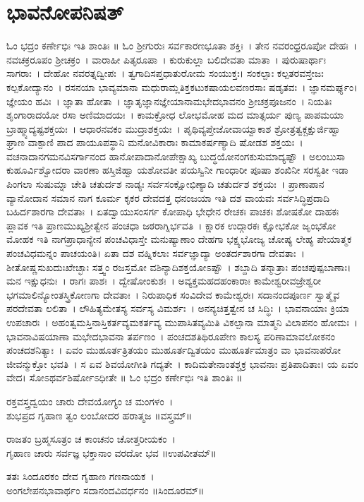 \section{ಭಾವನೋಪನಿಷತ್}
ಓಂ ಭದ್ರಂ ಕರ್ಣೇಭಿಃ ಇತಿ ಶಾಂತಿಃ ॥
ಓಂ ಶ್ರೀಗುರುಃ ಸರ್ವಕಾರಣಭೂತಾ ಶಕ್ತಿಃ~। ತೇನ ನವರಂಧ್ರರೂಪೋ ದೇಹಃ~। ನವಚಕ್ರರೂಪಂ ಶ್ರೀಚಕ್ರಂ~। ವಾರಾಹೀ ಪಿತೃರೂಪಾ~। ಕುರುಕುಲ್ಲಾ ಬಲಿದೇವತಾ ಮಾತಾ~। ಪುರುಷಾರ್ಥಾಃ ಸಾಗರಾಃ~। ದೇಹೋ ನವರತ್ನದ್ವೀಪಃ~। ತ್ವಗಾದಿಸಪ್ತಧಾತುರೋಮ ಸಂಯುಕ್ತಃ। ಸಂಕಲ್ಪಾಃ ಕಲ್ಪತರವಸ್ತೇಜಃ ಕಲ್ಪಕೋ\-ದ್ಯಾನಂ~। ರಸನಯಾ ಭಾವ್ಯಮಾನಾ ಮಧುರಾಮ್ಲತಿಕ್ತಕಟುಕಷಾಯಲವಣರಸಾಃ ಷಡೃತವಃ~। ಜ್ಞಾನಮರ್ಘ್ಯಂ। ಜ್ಞೇಯಂ ಹವಿಃ~। ಜ್ಞಾತಾ ಹೋತಾ~। ಜ್ಞಾತೃಜ್ಞಾನಜ್ಞೇಯಾನಾಮಭೇದಭಾವನಂ ಶ್ರೀಚಕ್ರಪೂಜನಂ~। ನಿಯತಿಃ ಶೃಂಗಾರಾದಯೋ ರಸಾ ಅಣಿಮಾದಯಃ~। ಕಾಮಕ್ರೋಧ ಲೋಭಮೋಹ ಮದ ಮಾತ್ಸರ್ಯ ಪುಣ್ಯ ಪಾಪಮಯಾ ಬ್ರಾಹ್ಮ್ಯಾದ್ಯಷ್ಟಶಕ್ತಯಃ~। ಆಧಾರನವಕಂ ಮುದ್ರಾಶಕ್ತಯಃ~। ಪೃಥಿವ್ಯಪ್ತೇಜೋವಾಯ್ವಾಕಾಶ ಶ್ರೋತ್ರತ್ವಕ್ಚಕ್ಷುರ್ಜಿಹ್ವಾ ಘ್ರಾಣ ವಾಕ್ಪಾಣಿ ಪಾದ ಪಾಯೂಪಸ್ಥಾನಿ ಮನೋವಿಕಾರಾಃ ಕಾಮಾಕರ್ಷಣ್ಯಾದಿ ಷೋಡಶ ಶಕ್ತಯಃ~। ವಚನಾದಾನಗಮನವಿಸರ್ಗಾನಂದ ಹಾನೋಪಾದಾನೋಪೇಕ್ಷಾಖ್ಯ ಬುದ್ಧಯೋನಂಗಕುಸುಮಾದ್ಯಷ್ಟೌ~। ಅಲಂಬುಸಾ ಕುಹೂರ್ವಿಶ್ವೋದರಾ ವಾರಣಾ ಹಸ್ತಿಜಿಹ್ವಾ ಯಶೋವತೀ ಪಯಸ್ವಿನೀ ಗಾಂಧಾರೀ ಪೂಷಾ ಶಂಖಿನೀ ಸರಸ್ವತೀ ಇಡಾ ಪಿಂಗಲಾ ಸುಷುಮ್ನಾ ಚೇತಿ ಚತುರ್ದಶ ನಾಡ್ಯಃ ಸರ್ವಸಂಕ್ಷೋಭಿಣ್ಯಾದಿ ಚತುರ್ದಶ ಶಕ್ತಯಃ~। ಪ್ರಾಣಾಪಾನ ವ್ಯಾನೋದಾನ ಸಮಾನ ನಾಗ ಕೂರ್ಮ ಕೃಕರ ದೇವದತ್ತ ಧನಂಜಯಾ ಇತಿ ದಶ ವಾಯವಃ ಸರ್ವಸಿದ್ಧಿಪ್ರದಾದಿ ಬಹಿರ್ದಶಾರಗಾ ದೇವತಾಃ~। ಏತದ್ವಾಯುಸಂಸರ್ಗ ಕೋಪಾಧಿ ಭೇಧೇನ ರೇಚಕಃ ಪಾಚಕಃ ಶೋಷಕೋ ದಾಹಕಃ ಪ್ಲಾವಕ ಇತಿ ಪ್ರಾಣಮುಖ್ಯಶ್ರೀತ್ವೇನ ಪಂಚಧಾ ಜಠರಾಗ್ನಿರ್ಭವತಿ~। ಕ್ಷಾರಕ ಉದ್ಗಾರಕಃ ಕ್ಷೋಭಕೋ ಜೃಂಭಕೋ ಮೋಹಕ ಇತಿ ನಾಗಪ್ರಾಧಾನ್ಯೇನ ಪಂಚವಿಧಾಸ್ತೇ ಮನುಷ್ಯಾಣಾಂ ದೇಹಗಾ ಭಕ್ಷ್ಯಭೋಜ್ಯ ಚೋಷ್ಯ ಲೇಹ್ಯ ಪೇಯಾತ್ಮಕ ಪಂಚವಿಧಮನ್ನಂ ಪಾಚಯಂತಿ। ಏತಾ ದಶ ವಹ್ನಿಕಲಾಃ ಸರ್ವಜ್ಞಾದ್ಯಾ ಅಂತರ್ದಶಾರಗಾ ದೇವತಾಃ~। ಶೀತೋಷ್ಣಸುಖದುಃಖೇಚ್ಛಾಃ ಸತ್ತ್ವಂ ರಜಸ್ತಮೋ ವಶಿನ್ಯಾದಿಶಕ್ತಯೋಽಷ್ಟೌ~। ಶಬ್ದಾದಿ ತನ್ಮಾತ್ರಾಃ ಪಂಚಪುಷ್ಪಬಾಣಾಃ। ಮನ ಇಕ್ಷುಧನುಃ~। ರಾಗಃ ಪಾಶಃ~। ದ್ವೇಷೋಂಕುಶಃ~। ಅವ್ಯಕ್ತಮಹದಹಂಕಾರಾಃ ಕಾಮೇಶ್ವರೀವಜ್ರೇಶ್ವರೀ ಭಗಮಾಲಿನ್ಯೋಂತಸ್ತ್ರಿಕೋಣಗಾ ದೇವತಾಃ~। ನಿರುಪಾಧಿಕ ಸಂವಿದೇವ ಕಾಮೇಶ್ವರಃ। ಸದಾನಂದಪೂರ್ಣ ಸ್ವಾತ್ಮೈವ ಪರದೇವತಾ ಲಲಿತಾ~। ಲೌಹಿತ್ಯಮೇತಸ್ಯ ಸರ್ವಸ್ಯ ವಿಮರ್ಶಃ~। ಅನನ್ಯಚಿತ್ತತ್ವೇನ ಚ ಸಿದ್ಧಿಃ~। ಭಾವನಾಯಾಃ ಕ್ರಿಯಾ ಉಪಚಾರಃ~। ಅಹಂತ್ವಮಸ್ತಿನಾಸ್ತಿಕರ್ತವ್ಯಮಕರ್ತವ್ಯ ಮುಪಾಸಿತವ್ಯಮಿತಿ ವಿಕಲ್ಪಾನಾ ಮಾತ್ಮನಿ ವಿಲಾಪನಂ ಹೋಮಃ~। ಭಾವನಾವಿಷಯಾಣಾ ಮಭೇದಭಾವನಾ ತರ್ಪಣಂ~। ಪಂಚದಶತಿಥಿರೂಪೇಣ ಕಾಲಸ್ಯ ಪರಿಣಾಮಾವಲೋಕನಂ ಪಂಚದಶನಿತ್ಯಾಃ~। ಏವಂ ಮುಹೂರ್ತತ್ರಿತಯಂ ಮುಹೂರ್ತದ್ವಿತಯಂ ಮುಹೂರ್ತಮಾತ್ರಂ ವಾ ಭಾವನಾಪರೋ ಜೀವನ್ಮುಕ್ತೋ ಭವತಿ~। ಸ ಏವ ಶಿವಯೋಗೀತಿ ಗದ್ಯತೇ~। ಕಾದಿಮತೇನಾಂತಶ್ಚಕ್ರ ಭಾವನಾಃ ಪ್ರತಿಪಾದಿತಾಃ। ಯ ಏವಂ ವೇದ। ಸೋಽಥರ್ವಶಿರ್ಷೋಽಧೀತೇ ॥ ಓಂ ಭದ್ರಂ ಕರ್ಣೇಭಿಃ ಇತಿ ಶಾಂತಿಃ ॥

ರಕ್ತವಸ್ತ್ರದ್ವಯಂ ಚಾರು ದೇವಯೋಗ್ಯಂ ಚ ಮಂಗಳಂ~।\\
ಶುಭಪ್ರದ ಗೃಹಾಣ ತ್ವಂ ಲಂಬೋದರ ಹರಾತ್ಮಜ ॥ವಸ್ತ್ರಮ್॥

ರಾಜತಂ ಬ್ರಹ್ಮಸೂತ್ರಂ ಚ ಕಾಂಚನಂ ಚೋತ್ತರೀಯಕಂ~।\\
ಗೃಹಾಣ ಚಾರು ಸರ್ವಜ್ಞ ಭಕ್ತಾನಾಂ ವರದೋ ಭವ ॥ಉಪವೀತಮ್॥

ತತಃ ಸಿಂದೂರಕಂ ದೇವ ಗೃಹಾಣ ಗಣನಾಯಕ~।\\
ಅಂಗಲೇಪನಭಾವಾರ್ಥಂ ಸದಾನಂದವಿವರ್ಧನಂ ॥ಸಿಂದೂರಮ್॥

